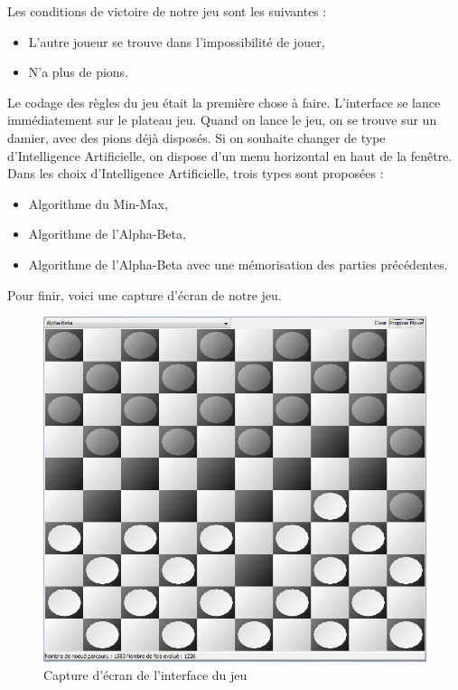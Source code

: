 \documentclass[a4paper, title page, 12pt]{report}
\begin{document}
Les conditions de victoire de notre jeu sont les suivantes :
\begin{itemize}
	\item L'autre joueur se trouve dans l'impossibilité de jouer,
	\item N'a plus de pions.
\end{itemize}

Le codage des règles du jeu était la première chose à faire. L'interface se lance immédiatement sur le plateau jeu. Quand on lance le jeu, on se trouve sur un damier, avec des pions déjà disposés. Si on souhaite changer de type d'Intelligence Artificielle, on dispose d'un menu horizontal en haut de la fenêtre. Dans les choix d'Intelligence Artificielle, trois types sont proposées : \\

\begin{itemize}
	\item Algorithme du Min-Max,
	\item Algorithme de l'Alpha-Beta,
	\item Algorithme de l'Alpha-Beta avec une mémorisation des parties précédentes.\\
\end{itemize}

Pour finir, voici une capture d'écran de notre jeu.\\

\begin{figure}[h]
\begin{center}
\includegraphics[scale=0.5]{img/screenshot_plateau.png}
\end{center}
\caption{Capture d'écran de l'interface du jeu}
\end{figure}
\end{document}
